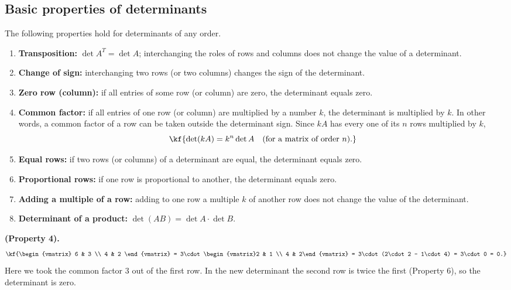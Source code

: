 \subsection{Basic properties of determinants}
The following properties hold for determinants of any order.
\begin{enumerate}[label=\arabic*)]
\item \textbf{Transposition:} $\det A^{T} = \det A$; interchanging the roles of rows
and columns does not change the value of a determinant.
\item \textbf{Change of sign:} interchanging two rows (or two columns) changes the
sign of the determinant.
\item \textbf{Zero row (column):} if all entries of some row (or column) are zero,
the determinant equals zero.
\item \textbf{Common factor:} if all entries of one row (or column) are multiplied
by a number $k$, the determinant is multiplied by $k$. In other words, a common
factor of a row can be taken outside the determinant sign. Since $kA$ has every one
of its $n$ rows multiplied by $k$,
\[\kf{\det(kA) = k^{n}\det A \quad (\text{for a matrix of order } n).}\]
\item \textbf{Equal rows:} if two rows (or columns) of a determinant are equal,
the determinant equals zero.
\item \textbf{Proportional rows:} if one row is proportional to another, the
determinant equals zero.
\item \textbf{Adding a multiple of a row:} adding to one row a multiple $k$ of
another row does not change the value of the determinant.
\item \textbf{Determinant of a product:}
$\det(AB)=\det A \cdot \det B$.
\end{enumerate}
\vspace{3pt}
\begin{misol}
\textbf{(Property 4).}
\[\kf{\begin{vmatrix}
6 & 3 \\
4 & 2
\end{vmatrix}
= 3\cdot\begin{vmatrix}2 & 1 \\ 4 & 2\end{vmatrix}
= 3\cdot(2\cdot 2 - 1\cdot 4) = 3\cdot 0 = 0.}\]
Here we took the common factor 3 out of the first row. In the new determinant the
second row is twice the first (Property 6), so the determinant is zero.
\end{misol}
